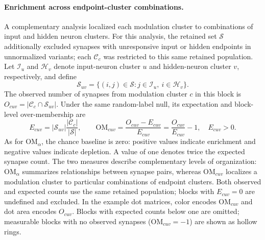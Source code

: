 \documentclass{article}
\begin{document}
\paragraph{Enrichment across endpoint-cluster combinations.}
A complementary analysis localized each modulation cluster to combinations
of input and hidden neuron clusters. For this analysis, the retained set
$\mathcal{S}$ additionally excluded synapses with unresponsive input or
hidden endpoints in unnormalized variants; each $\mathcal{C}_c$ was
restricted to this same retained population. Let $\mathcal{I}_u$ and
$\mathcal{H}_v$ denote input-neuron cluster $u$ and hidden-neuron cluster
$v$, respectively, and define
\begin{equation}
    \mathcal{S}_{uv}
    =\{(i,j)\in\mathcal{S}:j\in\mathcal{I}_u,\ i\in\mathcal{H}_v\}.
\end{equation}
The observed number of synapses from modulation cluster $c$ in this block
is $O_{cuv}=|\mathcal{C}_c\cap\mathcal{S}_{uv}|$. Under the same random-label
null, its expectation and block-level over-membership are
\begin{equation}
    E_{cuv}=|\mathcal{S}_{uv}|\frac{|\mathcal{C}_c|}{|\mathcal{S}|},
    \qquad
    \mathrm{OM}_{cuv}=\frac{O_{cuv}-E_{cuv}}{E_{cuv}}
                    =\frac{O_{cuv}}{E_{cuv}}-1,
    \quad E_{cuv}>0.
    \label{eq:endpoint-block-enrichment}
\end{equation}
As for $\mathrm{OM}_\alpha$, the chance baseline is zero: positive values indicate
enrichment and negative values indicate depletion. A value of one denotes
twice the expected synapse count. The two measures describe complementary
levels of organization: $\mathrm{OM}_\alpha$ summarizes relationships between
synapse pairs, whereas $\mathrm{OM}_{cuv}$ localizes a modulation cluster
to particular combinations of endpoint clusters. Both observed and expected
counts use the same retained population; blocks with $E_{cuv}=0$ are
undefined and excluded. In the example dot matrices, color encodes
$\mathrm{OM}_{cuv}$ and dot area encodes $O_{cuv}$. Blocks with expected
counts below one are omitted; measurable blocks with no observed synapses
($\mathrm{OM}_{cuv}=-1$) are shown as hollow rings.
\end{document}
